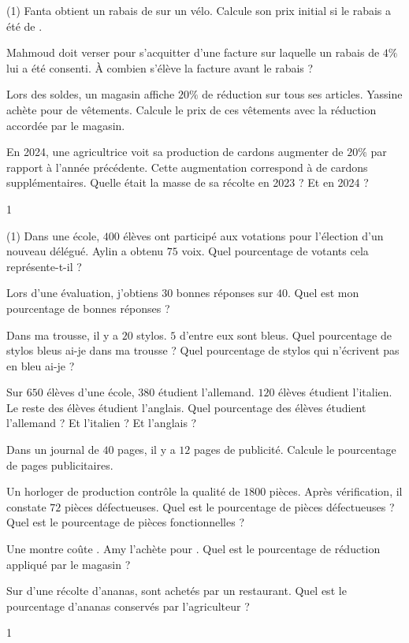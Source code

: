 \documentclass[a4paper,11pt]{report}
\begin{document}
\begin{exo}{
\begin{tasks}(1)
    \task Fanta obtient un rabais de  sur un vélo. Calcule son prix initial si le rabais a été de .
    
    \task Mahmoud doit verser  pour s'acquitter d'une facture sur laquelle un rabais de $4\%$ lui a été consenti. À combien s'élève la facture avant le rabais ?

    \task Lors des soldes, un magasin affiche $20\%$ de réduction sur tous ses articles. Yassine achète pour  de vêtements.  Calcule le prix de ces vêtements avec la réduction accordée par le magasin.

    \task En 2024, une agricultrice voit sa production de cardons augmenter de $20\%$ par rapport à l'année précédente. Cette augmentation correspond à  de cardons supplémentaires. Quelle était la masse de sa récolte en 2023 ? Et en 2024 ?
\end{tasks}
}{1}    
\end{exo}

\begin{exo}{
\begin{tasks}(1)
    \task Dans une école, $400$ élèves ont participé aux votations pour l'élection d'un nouveau délégué. Aylin a obtenu $75$ voix. Quel pourcentage de votants cela représente-t-il ?

    \task Lors d'une évaluation, j'obtiens $30$ bonnes réponses sur $40$. Quel est mon pourcentage de bonnes réponses ?

    \task Dans ma trousse, il y a $20$ stylos. $5$ d'entre eux sont bleus. Quel pourcentage de stylos bleus ai-je dans ma trousse ? Quel pourcentage de stylos qui n'écrivent pas en bleu ai-je ?

    \task Sur $650$ élèves d'une école, $380$ étudient l'allemand. $120$ élèves étudient l'italien. Le reste des élèves étudient l'anglais. Quel pourcentage des élèves étudient l'allemand ? Et l'italien ? Et l'anglais ?
    
    \task Dans un journal de $40$ pages, il y a $12$ pages de publicité. Calcule le pourcentage de pages publicitaires.

    \task Un horloger de production contrôle la qualité de $1800$ pièces. Après vérification, il constate $72$ pièces défectueuses. Quel est le pourcentage de pièces défectueuses ? Quel est le pourcentage de pièces fonctionnelles ?

    \task Une montre coûte . Amy l'achète pour . Quel est le pourcentage de réduction appliqué par le magasin ?

    \task Sur  d'une récolte d'ananas,   sont achetés par un restaurant. Quel est le pourcentage d'ananas conservés par l'agriculteur ? 
\end{tasks}
}{1}    
\end{exo}
\end{document}
